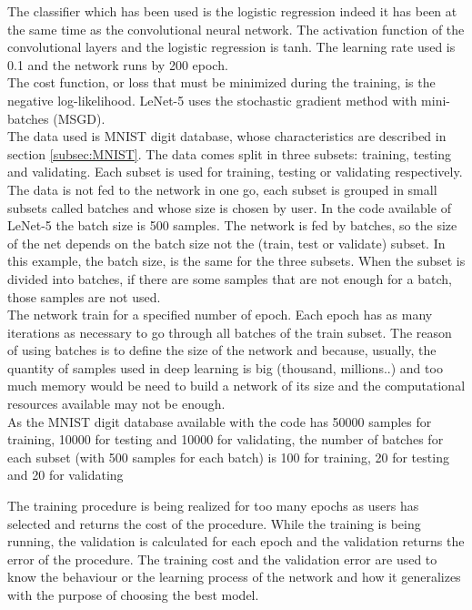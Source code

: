 The classifier which has been used is the logistic regression indeed it has been at the same time as the convolutional neural network. The activation function of the convolutional layers and the logistic regression is tanh. The learning rate used is 0.1 and the network runs by 200 epoch.\\

The cost function, or loss that must be minimized during the training, is the negative log-likelihood. LeNet-5 uses the stochastic gradient method with mini-batches (MSGD).\\

The data used is MNIST digit database, whose characteristics are described in section \ref{subsec:MNIST}. The data comes split in three subsets: training, testing and validating. Each subset is used for training, testing or validating respectively.\\

The data is not fed to the network in one go, each subset is grouped in small subsets called batches and whose size is chosen by user. In the code available of LeNet-5 the batch size is 500 samples. The network is fed by batches, so the size of the net depends on the batch size not the (train, test or validate) subset. In this example, the batch size, is the same for the three subsets. When the subset is divided into batches, if there are some samples that are not enough for a batch, those samples are not used.\\

The network train for a specified number of epoch. Each epoch has as many iterations as necessary to go through all batches of the train subset. The reason of using batches is to define the size of the network and because, usually, the quantity of samples used in deep learning is big (thousand, millions..) and too much memory would be need to build a network of its size and the computational resources available may not be enough.\\

As the MNIST digit database available with the code has 50000 samples for training, 10000 for testing and 10000 for validating, the number of batches for each subset (with 500 samples for each batch) is 100 for training, 20 for testing and 20 for validating

The training procedure is being realized for too many epochs as users has selected and returns the cost of the procedure. While the training is being running, the validation is calculated for each epoch and the validation returns the error of the procedure. The training cost and the validation error are used to know the behaviour or the learning process of the network and how it generalizes with the purpose of choosing the best model.\\

